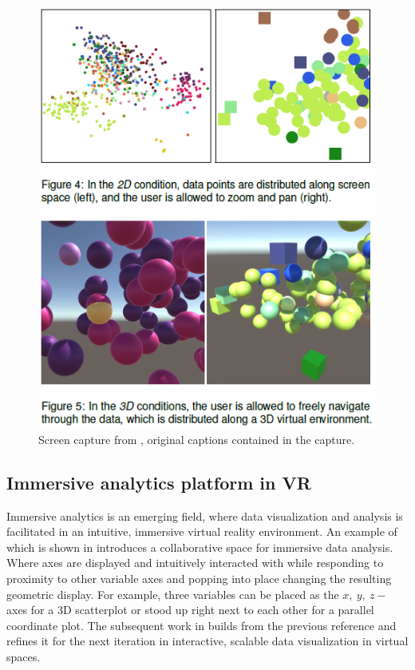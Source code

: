\documentclass{monashthesis}
\begin{document}
\begin{figure}

{\centering \includegraphics[width=0.5\linewidth]{./figures/wagner18fig} 

}

\caption{Screen capture from
\textcite{wagner_filho_immersive_2018}, original captions contained in
the capture.}\label{fig:wagner18fig}
\end{figure}

\subsection{Immersive analytics platform in
VR}\label{immersive-analytics-platform-in-vr}

Immersive analytics is an emerging field, where data visualization and
analysis is facilitated in an intuitive, immersive virtual reality
environment. An example of which is shown in
\textcite{cordeil_imaxes:_2017} introduces a collaborative space for
immersive data analysis. Where axes are displayed and intuitively
interacted with while responding to proximity to other variable axes and
popping into place changing the resulting geometric display. For
example, three variables can be placed as the \(x,~y,~z-\) axes for a 3D
scatterplot or stood up right next to each other for a parallel
coordinate plot. The subsequent work in
\textcite{cordeil_immersive_2019} builds from the previous reference and
refines it for the next iteration in interactive, scalable data
visualization in virtual spaces.
\end{document}
